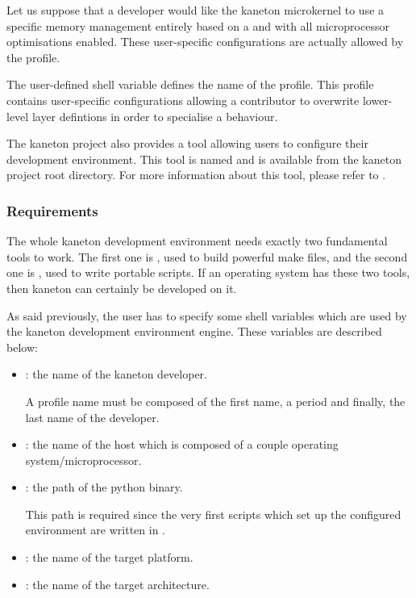 

Let us suppose that a developer would like the kaneton microkernel to
use a specific memory management entirely based on a 
and with all microprocessor optimisations enabled. These user-specific
configurations are actually allowed by the  profile.

The user-defined shell variable  defines the name
of the  profile. This profile contains user-specific
configurations allowing a contributor to overwrite lower-level layer defintions
in order to specialise a behaviour.

The kaneton project also provides a tool allowing users to configure
their development environment. This tool is named  and is
available from the kaneton project root directory. For more information about
this tool, please refer to .


%
%

\subsubsection{Requirements}

The whole kaneton development environment needs exactly two fundamental tools
to work. The first one is , used to build powerful make files,
and the second one is , used to write portable scripts. If an
operating system has these two tools, then kaneton can certainly be developed
on it.

As said previously, the user has to specify some shell variables which are
used by the kaneton development environment engine. These variables are
described below:

\begin{itemize}
  \item
    : the name of the kaneton developer.

    A  profile name must be composed of the first name, a period
    and finally, the last name of the developer.
  \item
    : the name of the host which is composed of
    a couple operating system/microprocessor.
  \item
    : the path of the python binary.

    This path is required since the very first scripts which set up the
    configured environment are written in .
  \item
    : the name of the target platform.
  \item
    : the name of the target architecture.
\end{itemize}

